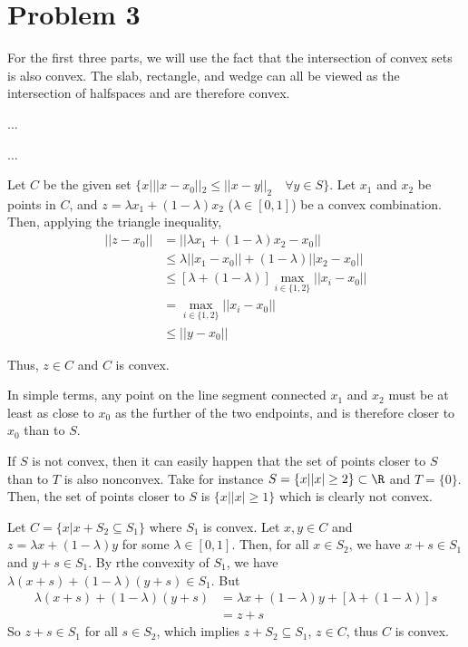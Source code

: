 \documentclass{homework}
\begin{document}
\section{Problem 3}
\begin{letterenum}
\item For the first three parts, we will use the fact that the intersection of convex sets is also convex.
The slab, rectangle, and wedge can all be viewed as the intersection of halfspaces and are therefore convex.
\item $\dots$
\item $\dots$
\item Let $C$ be the given set $\{x | ||x - x_0||_2 \leq ||x - y||_2 \quad \forall y \in S\}$. Let $x_1$ and
$x_2$ be points in $C$, and $z = \lambda x_1 + (1 - \lambda) x_2$ ($\lambda \in [0, 1]$) be a convex
combination. Then, applying the triangle inequality,
\begin{align*}
    ||z - x_0|| &= ||\lambda x_1 + (1 - \lambda) x_2 - x_0|| \\
        &\leq \lambda ||x_1 - x_0|| + (1 - \lambda) ||x_2 - x_0|| \\
        &\leq [\lambda + (1 - \lambda)] \max_{i\in \{1,2\}} ||x_i - x_0|| \\
        &= \max_{i\in \{1,2\}} ||x_i - x_0|| \\
        &\leq || y - x_0||
\end{align*}

Thus, $z \in C$ and $C$ is convex.

In simple terms, any point on the line segment connected $x_1$ and $x_2$ must be at least
as close to $x_0$ as the further of the two endpoints, and is therefore closer to $x_0$
than to $S$.

\item If $S$ is not convex, then it can easily happen that the set of points closer to $S$ than
to $T$ is also nonconvex. Take for instance $S = \{x | |x| \geq 2\} \subset \R$ and $T = \{ 0 \}$.
Then, the set of points closer to $S$ is $\{x | |x| \geq 1\}$ which is clearly not convex.

\item Let $C = \{x | x + S_2 \subseteq S_1\}$ where $S_1$ is convex. Let $x,y \in C$
and $z=\lambda x + (1 - \lambda) y$ for some  $\lambda \in [0,1]$. Then, for all $x\in S_2$,
we have $x+s \in S_1$ and $y + s \in S_1$. By rthe convexity of $S_1$, we have
$\lambda (x + s) + (1 - \lambda) (y+s) \in S_1$. But
\begin{align*}
    \lambda (x + s) + (1 - \lambda) (y+s) &= \lambda x + (1 - \lambda) y + [\lambda + (1 - \lambda)] s \\
        &= z + s
\end{align*}
So $z+s\in S_1$ for all $s \in S_2$, which implies $z+S_2\subseteq S_1$, $z \in C$, thus $C$ is convex.


\end{letterenum}
\end{document}
